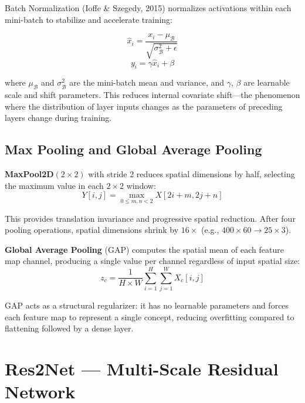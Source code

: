 \documentclass[12pt]{report}
\begin{document}
Batch Normalization (Ioffe \& Szegedy, 2015) normalizes activations within each mini-batch
to stabilize and accelerate training:

\begin{equation}
    \hat{x}_i = \frac{x_i - \mu_\mathcal{B}}{\sqrt{\sigma^2_\mathcal{B} + \epsilon}}
\end{equation}
\begin{equation}
    y_i = \gamma \hat{x}_i + \beta
\end{equation}

where $\mu_\mathcal{B}$ and $\sigma^2_\mathcal{B}$ are the mini-batch mean and variance,
and $\gamma$, $\beta$ are learnable scale and shift parameters. This reduces internal
covariate shift---the phenomenon where the distribution of layer inputs changes as the
parameters of preceding layers change during training.

\subsection{Max Pooling and Global Average Pooling}

\textbf{MaxPool2D}$(2 \times 2)$ with stride 2 reduces spatial dimensions by half, selecting
the maximum value in each $2 \times 2$ window:
\begin{equation}
    Y[i,j] = \max_{0 \leq m,n < 2} X[2i+m, 2j+n]
\end{equation}

This provides translation invariance and progressive spatial reduction. After four pooling
operations, spatial dimensions shrink by $16\times$ (e.g., $400 \times 60 \to 25 \times 3$).

\textbf{Global Average Pooling} (GAP) computes the spatial mean of each feature map channel,
producing a single value per channel regardless of input spatial size:
\begin{equation}
    z_c = \frac{1}{H \times W} \sum_{i=1}^{H} \sum_{j=1}^{W} X_c[i,j]
\end{equation}

GAP acts as a structural regularizer: it has no learnable parameters and forces each
feature map to represent a single concept, reducing overfitting compared to flattening
followed by a dense layer.


\section{Res2Net --- Multi-Scale Residual Network}
\end{document}
